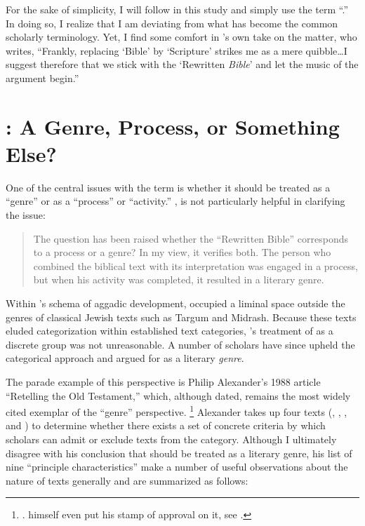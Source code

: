 For the sake of simplicity, I will follow \vermes in this study and simply use the term ``\RwB.'' In doing so, I realize that I am deviating from what has become the common scholarly terminology. Yet, I find some comfort in \vermes's own take on the matter, who writes, ``Frankly, replacing `Bible' by `Scripture' strikes me as a mere quibble\ldots{}I suggest therefore that we stick with the `Rewritten \emph{Bible}' and let the music of the argument begin.''%
    \autocite[original emphasis]{vermes_zsengeller2014} 

\section{\RWB: A Genre, Process, or Something Else?}

 One of the central issues with the term \RwB is whether it should be treated as a ``genre'' or as a ``process'' or ``activity.'' \vermes, is not particularly helpful in clarifying the issue: 

\begin{quote}
    The question has been raised whether the ``Rewritten Bible'' corresponds to a process or a genre? In my view, it verifies both. The person who combined the biblical text with its interpretation was engaged in a process, but when his activity was completed, it resulted in a literary genre.%
    \autocite[8]{vermes_zsengeller2014}
\end{quote} 

Within \vermes's schema of aggadic development, \rwb occupied a liminal space outside the genres of classical Jewish texts such as Targum and Midrash. Because these texts eluded categorization within  established text categories, \vermes's treatment of \rwb as a discrete group was not unreasonable. A number of scholars have since upheld the categorical approach and argued for \rwb as a literary \emph{genre}. 

The parade example of this perspective is Philip Alexander's 1988 article ``Retelling the Old Testament,'' which, although dated, remains the most widely cited exemplar of the ``genre'' perspective.%
    \footnote{\cite{alexander_carson-williamson1988}.
        \vermes himself even put his stamp of approval on it, see
        \cite[4]{vermes_zsengeller2014}.}
Alexander takes up four \rwB texts (\jub, \ga, \lab, and \ant) to determine whether there exists a set of concrete criteria by which scholars can admit or exclude texts from the category. Although I ultimately disagree with his conclusion that \rwb should be treated as a literary genre, his list of nine ``principle characteristics'' make a number of useful observations about the nature of \rwb texts generally and are summarized as follows: 

